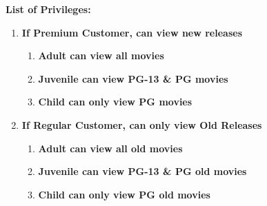 \documentclass[12pt]{article}
\begin{document}
\begin{enumerate}
\textbf{List of Privileges:}
\begin{enumerate}
  \item \textbf{If Premium Customer, can view new releases}
  \begin{enumerate}
    \item \textbf{Adult can view all movies} \\
    \item \textbf{Juvenile can view PG-13 & PG movies} \\
    \item \textbf{Child can only view PG movies} \\
  \end{enumerate}
  \item \textbf{If Regular Customer, can only view Old Releases}
  \begin{enumerate}
    \item \textbf{Adult can view all old movies} \\
    \item \textbf{Juvenile can view PG-13 & PG old movies} \\
    \item \textbf{Child can only view PG old movies} \\
  \end{enumerate}
\end{enumerate}

\end{enumerate}
\end{document}
